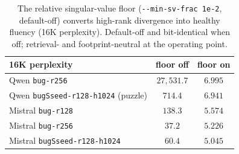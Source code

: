 \documentclass[11pt]{article}
\begin{document}
\begin{table}[t]
\centering
\caption{The relative singular-value floor (\texttt{-{}-min-sv-frac 1e-2},
default-off) converts high-rank divergence into healthy fluency (16K perplexity).
Default-off and bit-identical when off; retrieval- and footprint-neutral at the
operating point.}
\label{tab:floor}
\begin{tabular}{lcc}
\toprule
16K perplexity & floor off & floor on \\
\midrule
Qwen \texttt{bug-r256}                    & $27{,}531.7$ & $\mathbf{6.995}$ \\
Qwen \texttt{bugSseed-r128-h1024} (puzzle)& $714.4$      & $\mathbf{6.941}$ \\
Mistral \texttt{bug-r128}                 & $138.3$      & $\mathbf{5.574}$ \\
Mistral \texttt{bug-r256}                 & $37.2$       & $\mathbf{5.226}$ \\
Mistral \texttt{bugSseed-r128-h1024}      & $60.4$       & $\mathbf{5.045}$ \\
\bottomrule
\end{tabular}
\end{table}
\end{document}
